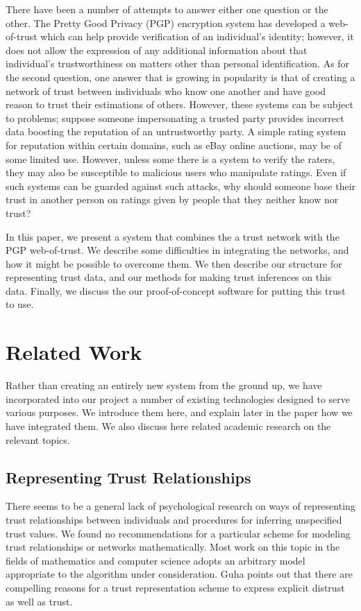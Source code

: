 \documentclass[letterpaper]{www2006-submission}
\begin{document}
There have been a number of attempts to answer either one question or the other.  The Pretty Good Privacy (PGP) encryption system has developed a web-of-trust which can help provide verification of an individual's identity;  however, it does not allow the expression of any additional information about that individual's trustworthiness on matters other than personal identification.  As for the second question, one answer that is growing in popularity is that of creating a network of trust between individuals who know one another and have good reason to trust their estimations of others.  However, these systems can be subject to problems; suppose someone impersonating a trusted party provides incorrect data boosting the reputation of an untrustworthy party.  A simple rating system for reputation within certain domains, such as eBay online auctions, may be of some limited use.  However, unless some there is a system to verify the raters, they may also be susceptible to malicious users who manipulate ratings.  Even if such systems can be guarded against such attacks, why should someone base their trust in another person on ratings given by people that they neither know nor trust?

In this paper, we present a system that combines the a trust network with the PGP web-of-trust.  We describe some difficulties in integrating the networks, and how it might be possible to overcome them.  We then describe our structure for representing trust data, and our methods for making trust inferences on this data.  Finally, we discuss the our proof-of-concept software for putting this trust to use.

\section{Related Work}
Rather than creating an entirely new system from the ground up, we have incorporated into our project a number of existing technologies designed to serve various purposes.  We introduce them here, and explain later in the paper how we have integrated them.  We also discuss here  related academic research on the relevant topics.

\subsection{Representing Trust Relationships}
There seems to be a general lack of psychological research on ways of representing trust relationships between individuals and procedures for inferring unspecified trust values.  We found no recommendations for a particular scheme for modeling trust relationships or networks mathematically.  Most work on this topic in the fields of mathematics and computer science adopts an arbitrary model appropriate to the algorithm under consideration. Guha points out \citep{guha04propagation} that there are compelling reasons for a trust representation scheme to express explicit distrust as well as trust.
\end{document}
